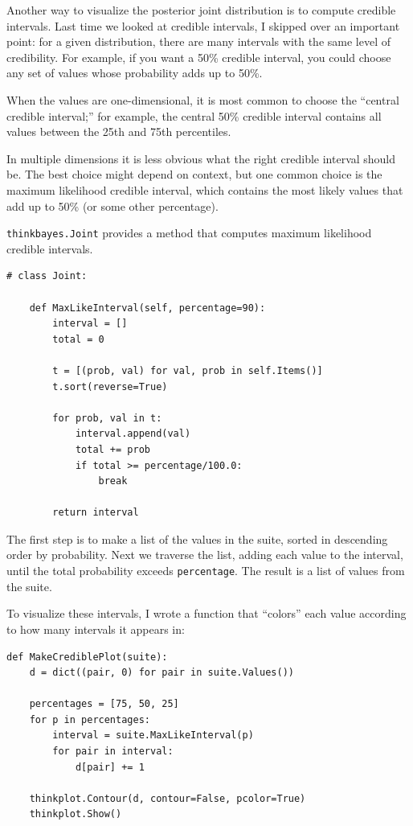 \documentclass[12pt]{book}
\begin{document}
Another way to visualize the posterior joint distribution is to
compute credible intervals.  Last time we looked at credible intervals,
I skipped over an important point: for a given distribution, there
are many intervals with the same level of credibility.  For example,
if you want a 50\% credible interval, you could choose any set of
values whose probability adds up to 50\%.

When the values are one-dimensional, it is most common to choose
the ``central credible interval;'' for example, the central 50\%
credible interval contains all values between the 25th and 75th
percentiles.

In multiple dimensions it is less obvious what the right credible
interval should be.  The best choice might depend on context, but
one common choice is the maximum likelihood credible interval, which
contains the most likely values that add up to 50\% (or some other
percentage).

{\tt thinkbayes.Joint} provides a method that computes maximum
likelihood credible intervals. 

\begin{verbatim}
# class Joint:

    def MaxLikeInterval(self, percentage=90):
        interval = []
        total = 0

        t = [(prob, val) for val, prob in self.Items()]
        t.sort(reverse=True)

        for prob, val in t:
            interval.append(val)
            total += prob
            if total >= percentage/100.0:
                break

        return interval
\end{verbatim}

The first step is to make a list of the values in the suite,
sorted in descending order by probability.  Next we traverse the
list, adding each value to the interval, until the total
probability exceeds {\tt percentage}.  The result is a list
of values from the suite.

To visualize these intervals, I wrote a function that ``colors''
each value according to how many intervals it appears in:

\begin{verbatim}
def MakeCrediblePlot(suite):
    d = dict((pair, 0) for pair in suite.Values())

    percentages = [75, 50, 25]
    for p in percentages:
        interval = suite.MaxLikeInterval(p)
        for pair in interval:
            d[pair] += 1

    thinkplot.Contour(d, contour=False, pcolor=True)
    thinkplot.Show()
\end{verbatim}
\end{document}
